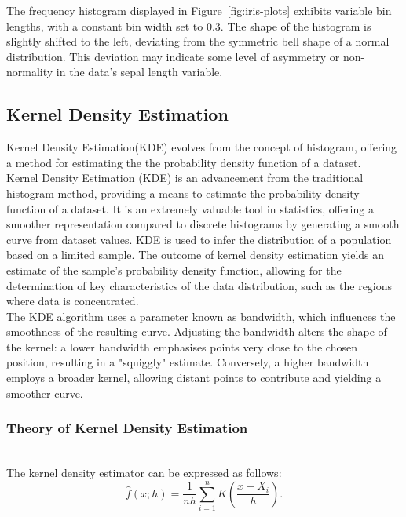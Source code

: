 \documentclass{article}\usepackage[]{graphicx}\usepackage[]{xcolor}
\numberwithin{equation}{section}
\begin{document}
\noindent The frequency histogram displayed in Figure~\ref{fig:iris-plots} exhibits variable bin lengths, with a constant bin width set to 0.3. The shape of the histogram is slightly shifted to the left, deviating from the symmetric bell shape of a normal distribution. This deviation may indicate some level of asymmetry or non-normality in the data's sepal length variable.

\subsection{Kernel Density Estimation}

Kernel Density Estimation(KDE) evolves from the concept of histogram, offering a method for estimating the the probability density function of a dataset.\\

\noindent 
Kernel Density Estimation (KDE) is an advancement from the traditional histogram method, providing a means to estimate the probability density function of a dataset. It is an extremely valuable tool in statistics, offering a smoother representation compared to discrete histograms by generating a smooth curve from dataset values. KDE is used to infer the distribution of a population based on a limited sample. The outcome of kernel density estimation yields an estimate of the sample's probability density function, allowing for the determination of key characteristics of the data distribution, such as the regions where data is concentrated.\\

\noindent
The KDE algorithm uses a parameter known as bandwidth, which influences the smoothness of the resulting curve. Adjusting the bandwidth alters the shape of the kernel: a lower bandwidth emphasises points very close to the chosen position, resulting in a "squiggly" estimate. Conversely, a higher bandwidth employs a broader kernel, allowing distant points to contribute and yielding a smoother curve.

\subsubsection{Theory of Kernel Density Estimation}\\

\noindent
The kernel density estimator can be expressed as follows:
$$\hat{f}(x; h) = \frac{1}{nh} \sum_{i=1}^{n} K\left(\frac{x - X_i}{h}\right).$$
\end{document}
